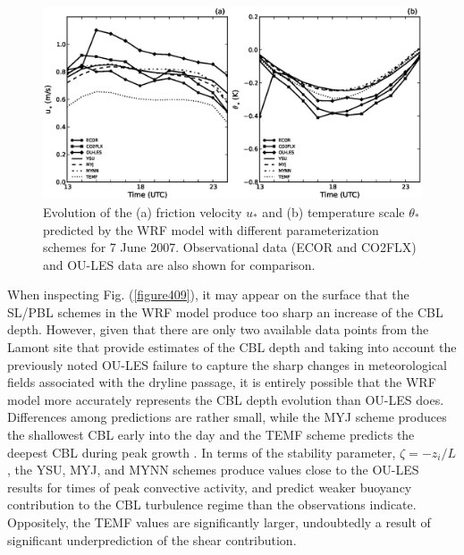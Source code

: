 \begin{figure}[ht!]
\begin{center}
\includegraphics[width=\textwidth]{figures/chapter4/ust_tst_phys_20070607}
\end{center}
\caption{Evolution of the (a) friction velocity $u_*$ and (b) temperature scale $\theta_*$ predicted by the WRF model with different parameterization schemes for 7 June 2007. Observational data (ECOR and CO2FLX) and OU-LES data are also shown for comparison.}
\label{figure408}
\end{figure}


When inspecting Fig. (\autoref{figure409}), it may appear on the surface that the SL\slash PBL schemes in the WRF model produce too sharp an increase of the CBL depth. However, given that there are only two available data points from the Lamont site that provide estimates of the CBL depth and taking into account the previously noted OU-LES failure to capture the sharp changes in meteorological fields associated with the dryline passage, it is entirely possible that the WRF model more accurately represents the CBL depth evolution than OU-LES does. Differences among predictions are rather small, while the MYJ scheme produces the shallowest CBL early into the day and the TEMF scheme predicts the deepest CBL during peak growth . In terms of the stability parameter, $\zeta = -z_i / L$, the YSU, MYJ, and MYNN schemes produce values close to the OU-LES results for times of peak convective activity, and predict weaker buoyancy contribution to the CBL turbulence regime than the observations indicate. Oppositely, the TEMF values are significantly larger, undoubtedly a result of significant underprediction of the shear contribution. 


